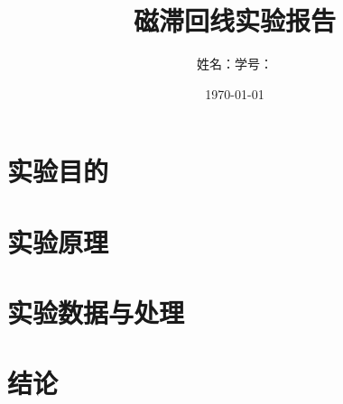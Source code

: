 \documentclass[11pt]{article}
\title{磁滞回线实验报告}
\author{姓名：\quad 学号：}
\date{\today}
\begin{document}
\maketitle

\section{实验目的}

\section{实验原理}

\section{实验数据与处理}

\section{结论}
\end{document}
